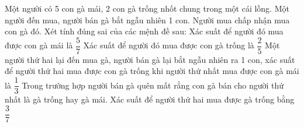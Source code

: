 \begin{ex}%
    Một người có 5 con gà mái, 2 con gà trống nhốt chung trong một cái lồng. Một người đến mua, người bán gà bắt ngẫu nhiên 1 con. Người mua chấp nhận mua con gà đó. Xét tính đúng sai của các mệnh đề sau:
    \choiceTF
    {\True Xác suất để người đó mua được con gà mái là $\dfrac{5}{7}$}
    { Xác suất để người đó mua được con gà trống là $\dfrac{2}{5}$}
    {\True Một người thứ hai lại đến mua gà, người bán gà lại bắt ngẫu nhiên ra 1 con, xác suất để người thứ hai mua được con gà trống khi người thứ nhất mua được con gà mái là $\dfrac{1}{3}$}
    {Trong trường hợp người bán gà quên mất rằng con gà bán cho người thứ nhất là gà trống hay gà mái. Xác suất để người thứ hai mua được gà trống bằng $\dfrac{3}{7}$}
\end{ex}

